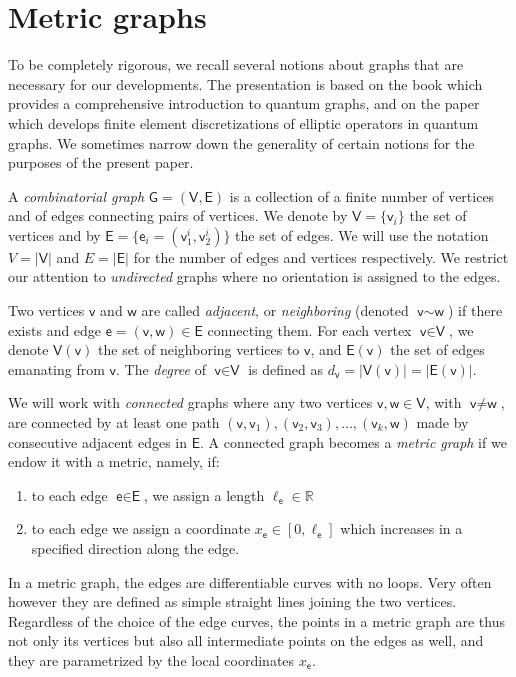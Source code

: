 \documentclass[11pt,a4paper,twoside]{article}
\theoremstyle{definition}
\numberwithin{equation}{section}
\newcommand{\bR}{\ensuremath{\mathbb{R}}}
\newcommand{\G}{\ensuremath{\textsf{G}}} %
\newcommand{\E}{\ensuremath{\textsf{E}}} %
\newcommand{\V}{\ensuremath{\textsf{V}}} %
\newcommand{\vv}{\ensuremath{\textsf{v}}}
\newcommand{\ww}{\ensuremath{\textsf{w}}}
\newcommand{\ee}{\ensuremath{\textsf{e}}}
\newcommand{\<}{\langle}
\renewcommand{\>}{\rangle}
\begin{document}
\appendix
\section{Metric graphs}
\label{sec:metric-graphs}
To be completely rigorous, we recall several notions about graphs that are necessary for our developments. The presentation is based on the book \cite{BK2013} which provides a comprehensive introduction to quantum graphs, and on the paper \cite{AB2018} which develops finite element discretizations of elliptic operators in quantum graphs. We sometimes narrow down the generality of certain notions for the purposes of the present paper.

A \emph{combinatorial graph} $\G = (\V, \E)$ is a collection of a finite number of vertices and of edges connecting pairs of vertices. We denote by $\V=\{\vv_i\}$ the set of vertices and by $\E=\{\ee_i=(\vv_1^i, \vv_2^i) \}$ the set of edges. We will use the notation $V = |\V|$ and $E=|\E|$ for the number of edges and vertices respectively. We restrict our attention to \emph{undirected} graphs where no orientation is assigned to the edges. %

Two vertices $\vv$ and $\ww$ are called \emph{adjacent}, or \emph{neighboring} (denoted $\vv\sim \ww$) if there exists and edge $\ee=(\vv,\ww)\in \E$ connecting them. For each vertex $\vv\in \V$, we denote $\V(\vv)$ the set of neighboring vertices to $\vv$, and $\E(\vv)$ the set of edges emanating from $\vv$. The \emph{degree} of $\vv\in \V$ is defined as $d_\vv = | \V(\vv)| = |\E(\vv)|$.

We will work with \emph{connected} graphs where any two vertices $\vv, \ww\in\V$, with $\vv\neq \ww$, are connected by at least one path $(\vv, \vv_1), (\vv_2, \vv_3),\dots, (\vv_k, \ww)$ made by consecutive adjacent edges in $\E$. A connected graph becomes a \emph{metric graph} if we endow it with a metric, namely, if:
\begin{enumerate}
      \item to each edge $\ee\in\E$, we assign a length $\ell_\ee \in \bR$
      \item to each edge we assign a coordinate $x_\ee \in [0, \ell_\ee]$ which increases in a specified direction along the edge.
\end{enumerate}
In a metric graph, the edges are differentiable curves with no loops. Very often however they are defined as simple straight lines joining the two vertices. Regardless of the choice of the edge curves, the points in a metric graph are thus not only its vertices but also all intermediate points on the edges as well, and they are parametrized by the local coordinates $x_\ee$.
\end{document}
